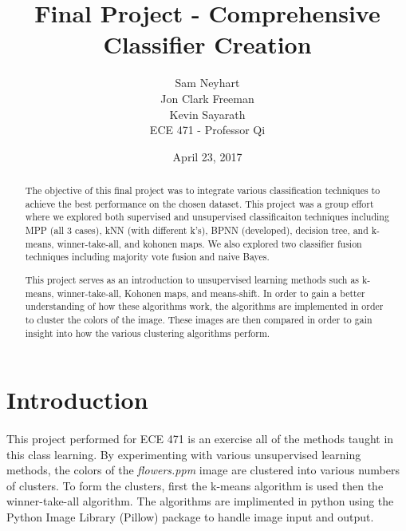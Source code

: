 \documentclass{article}
\begin{document}
\title{Final Project - Comprehensive Classifier Creation}
\author{Sam Neyhart\\ Jon Clark Freeman\\ Kevin Sayarath\\ ECE 471 - Professor Qi}
\date{April 23, 2017}
\maketitle
\newpage

\begin{abstract}
The objective of this final project was to integrate various classification
techniques to achieve the best performance on the chosen dataset. This project
was a group effort where we explored both supervised and unsupervised
classificaiton techniques including MPP (all 3 cases), kNN (with different k's),
BPNN (developed), decision tree, and k-means, winner-take-all, and kohonen maps.
We also explored two classifier fusion techniques including majority vote fusion
and naive Bayes.
\end{abstract}
\newpage


\begin{abstract}
This project serves as an introduction to unsupervised learning methods 
such as k-means, winner-take-all, Kohonen maps, and means-shift. In order
to gain a better understanding of how these algorithms work, the algorithms
are implemented in order to cluster the colors of the image. These images
are then compared in order to gain insight into how the various clustering
algorithms perform.
\end{abstract}
\newpage


\section*{Introduction}
\paragraph{}
This project performed for ECE 471 is an exercise all of the methods taught in this class learning.
By experimenting with various unsupervised learning methods, the colors
of the \textit{flowers.ppm} image are clustered into various numbers of clusters.
To form the clusters, first the k-means algorithm is used then the 
winner-take-all algorithm. The algorithms are implimented in python
using the Python Image Library (Pillow) package to handle image input and 
output.
\end{document}
